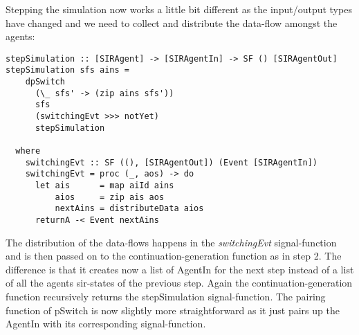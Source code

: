 Stepping the simulation now works a little bit different as the input/output types have changed and we need to collect and distribute the data-flow amongst the agents:

\begin{verbatim}
stepSimulation :: [SIRAgent] -> [SIRAgentIn] -> SF () [SIRAgentOut]
stepSimulation sfs ains =
    dpSwitch
      (\_ sfs' -> (zip ains sfs'))
      sfs
      (switchingEvt >>> notYet)
      stepSimulation

  where
    switchingEvt :: SF ((), [SIRAgentOut]) (Event [SIRAgentIn])
    switchingEvt = proc (_, aos) -> do
      let ais      = map aiId ains
          aios     = zip ais aos
          nextAins = distributeData aios
      returnA -< Event nextAins
\end{verbatim}

The distribution of the data-flows happens in the \textit{switchingEvt} signal-function and is then passed on to the continuation-generation function as in step 2. The difference is that it creates now a list of AgentIn for the next step instead of a list of all the agents sir-states of the previous step. Again the continuation-generation function recursively returns the stepSimulation signal-function. The pairing function of pSwitch is now slightly more straightforward as it just pairs up the AgentIn with its corresponding signal-function.

